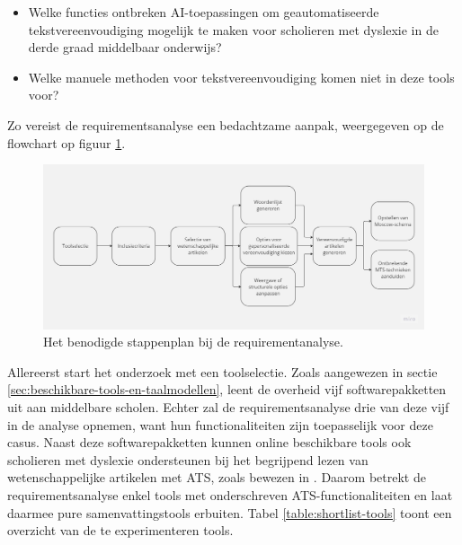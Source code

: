 \begin{itemize}
	\item Welke functies ontbreken AI-toepassingen om geautomatiseerde tekstvereenvoudiging mogelijk te maken voor scholieren met dyslexie in de derde graad middelbaar onderwijs?
	\item Welke manuele methoden voor tekstvereenvoudiging komen niet in deze tools voor?
\end{itemize}

Zo vereist de requirementsanalyse een bedachtzame aanpak, weergegeven op de flowchart op figuur \ref{img:flowchart-requirementsanalyse}.

\begin{figure}[H]
	\includegraphics[width=\linewidth]{img/flowchart-requirementsanalyse.jpg}
	\caption{Het benodigde stappenplan bij de requirementanalyse.}
	\label{img:flowchart-requirementsanalyse}
\end{figure}

Allereerst start het onderzoek met een toolselectie. Zoals aangewezen in sectie \ref{sec:beschikbare-tools-en-taalmodellen}, leent de overheid vijf softwarepakketten uit aan middelbare scholen. Echter zal de requirementsanalyse drie van deze vijf in de analyse opnemen, want hun functionaliteiten zijn toepasselijk voor deze casus. Naast deze softwarepakketten kunnen online beschikbare tools ook scholieren met dyslexie ondersteunen bij het begrijpend lezen van wetenschappelijke artikelen met ATS, zoals bewezen in \textcite{Bingel2018}. Daarom betrekt de requirementsanalyse enkel tools met onderschreven ATS-functionaliteiten en laat daarmee pure samenvattingstools erbuiten. Tabel \ref{table:shortlist-tools} toont een overzicht van de te experimenteren tools.


